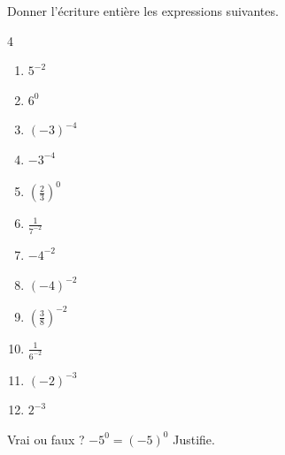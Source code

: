 \documentclass[main.tex]{subfiles}
\begin{document}
\begin{exercise} Donner l'écriture entière les expressions suivantes.
	
	\begin{multicols}{4}
		\begin{enumerate}[label={$\Alph*=$\rule{0pt}{1.8em}},leftmargin=*] 
			\item $5^{-2}$
			\item $6^0$
			\item $(-3)^{-4}$ 
			\item $-3^{-4}$ 
			\item $\left(\tfrac{2}{3}\right)^{0}$
			\item $\tfrac{1}{7^{-2}}$
			\item $-4^{-2}$
			\item $(-4)^{-2}$
			\item  $\left(\tfrac{3}{8}\right)^{-2}$
			\item $\tfrac{1}{6^{-2}}$
			\item $(-2)^{-3}$
			\item $2^{-3}$
		\end{enumerate}
	\end{multicols}
\end{exercise} 
\begin{cBox}
	Vrai ou faux ? $-5^0=(-5)^0$  Justifie.
\end{cBox}
\end{document}
